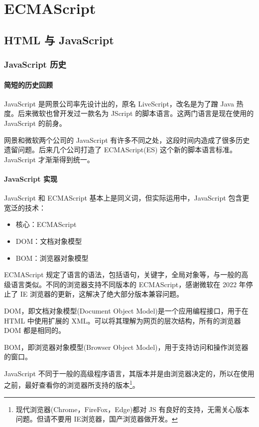 \part{ECMAScript}
\chapter{HTML 与 JavaScript}
\section{JavaScript 历史}
\subsection{简短的历史回顾}

JavaScript 是网景公司率先设计出的，原名 LiveScript，改名是为了蹭 Java 热度。后来微软也曾开发过一款名为 JScript 的脚本语言。这两门语言是现在使用的 JavaScript 的前身。

网景和微软两个公司的 JavaScript 有许多不同之处，这段时间内造成了很多历史遗留问题。后来几个公司打造了 ECMAScript(ES) 这个新的脚本语言标准。JavaScript 才渐渐得到统一。

\subsection{JavaScript 实现}

JavaScript 和 ECMAScript 基本上是同义词，但实际运用中，JavaScript 包含更宽泛的技术：
\begin{itemize}
    \item 核心：ECMAScript
    \item DOM：文档对象模型
    \item BOM：浏览器对象模型
\end{itemize}

ECMAScript 规定了语言的语法，包括语句，关键字，全局对象等，与一般的高级语言类似。不同的浏览器支持不同版本的 ECMAScript，感谢微软在 2022 年停止了 IE 浏览器的更新，这解决了绝大部分版本兼容问题。

DOM，即文档对象模型(Document Object Model)是一个应用编程接口，用于在 HTML 中使用扩展的 XML。可以将其理解为网页的层次结构，所有的浏览器 DOM 都是相同的。

BOM，即浏览器对象模型(Browser Object Model)，用于支持访问和操作浏览器的窗口。

JavaScript 不同于一般的高级程序语言，其版本并是由浏览器决定的，所以在使用之前，最好查看你的浏览器所支持的版本\footnote{现代浏览器(Chrome，FireFox，Edge)都对 JS 有良好的支持，无需关心版本问题。但请不要用 IE浏览器，国产浏览器做开发。}。

\newpage